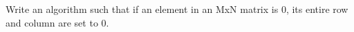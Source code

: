  \label{sssec:ex1_07}

Write an algorithm such that if an element in an MxN matrix is 0, its entire row and column are set to 0.



